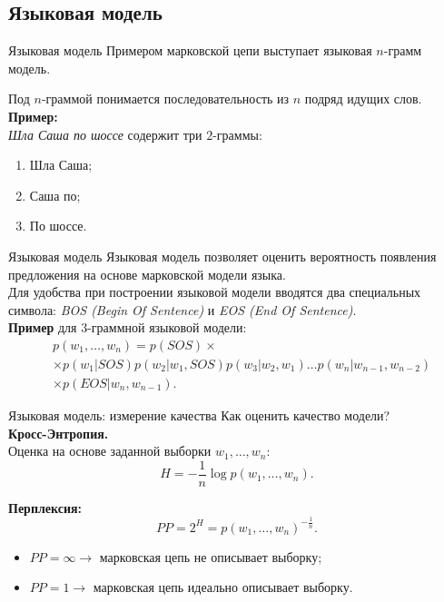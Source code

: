 \subsection{Языковая модель}
\begin{frame}{Языковая модель}
Примером марковской цепи выступает языковая $n$-грамм модель.

Под $n$-граммой понимается последовательность из $n$ подряд идущих слов.\\

\textbf{Пример:}\\
\textit{Шла Саша по шоссе} содержит три $2$-граммы:
\begin{enumerate}
\item Шла Саша;
\item Саша по;
\item По шоссе.
\end{enumerate}

\end{frame}
\begin{frame}{Языковая модель}
Языковая модель позволяет оценить вероятность появления предложения на основе марковской модели языка.\vspace{0.2cm}\\

Для удобства при построении языковой модели вводятся два специальных символа:
\textit{BOS (Begin Of Sentence)} и \textit{EOS (End Of Sentence)}. \\
\vspace{0.2cm}
\textbf{Пример} для $3$-граммной языковой модели:
\begin{align}
&p(w_1,\dots,w_n)=  p(SOS) \times \nonumber \\[18pt]
&\times p(w_1|SOS)p(w_2|w_1,SOS)p(w_3|w_2,w_1)\dots p(w_{n}|w_{n-1},w_{n-2}) \nonumber \\[18pt]
&\times p(EOS|w_{n},w_{n-1}).\nonumber  
\end{align}
\end{frame}

\begin{frame}{Языковая модель: измерение качества}
Как оценить качество модели?\\
\textbf{Кросс-Энтропия.}\\
Оценка на основе заданной выборки $w_1,\dots,w_n$:
\[
        H = -\frac{1}{n} \log p(w_1,\dots,w_n).
\]

\textbf{Перплексия:}
\[
        PP = 2^{H} = p(w_1,\dots,w_n)^{-\frac{1}{n}}.
\]
\begin{itemize}
\item $PP = \infty \to$ марковская цепь не описывает выборку;
\item $PP = 1 \to$ марковская цепь идеально описывает выборку.
\end{itemize}
\end{frame}


